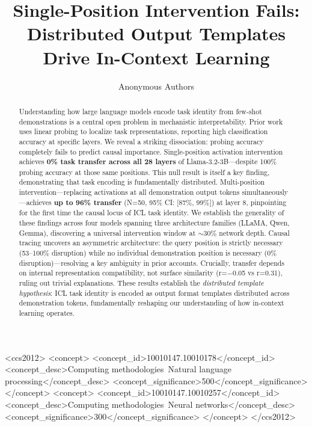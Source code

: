 \documentclass[sigconf,anonymous]{acmart}
\begin{document}
\title{Single-Position Intervention Fails: Distributed Output Templates Drive In-Context Learning}

\author{Anonymous Authors}

\begin{abstract}
Understanding how large language models encode task identity from few-shot demonstrations is a central open problem in mechanistic interpretability. Prior work uses linear probing to localize task representations, reporting high classification accuracy at specific layers. We reveal a striking dissociation: probing accuracy completely fails to predict causal importance. Single-position activation intervention achieves \textbf{0\% task transfer across all 28 layers} of Llama-3.2-3B---despite 100\% probing accuracy at those same positions. This null result is itself a key finding, demonstrating that task encoding is fundamentally distributed. Multi-position intervention---replacing activations at all demonstration output tokens simultaneously---achieves \textbf{up to 96\% transfer} (N=50, 95\% CI: [87\%, 99\%]) at layer 8, pinpointing for the first time the causal locus of ICL task identity. We establish the generality of these findings across four models spanning three architecture families (LLaMA, Qwen, Gemma), discovering a universal intervention window at $\sim$30\% network depth. Causal tracing uncovers an asymmetric architecture: the query position is strictly necessary (53--100\% disruption) while no individual demonstration position is necessary (0\% disruption)---resolving a key ambiguity in prior accounts. Crucially, transfer depends on internal representation compatibility, not surface similarity (r=$-$0.05 vs r=0.31), ruling out trivial explanations. These results establish the \emph{distributed template hypothesis}: ICL task identity is encoded as output format templates distributed across demonstration tokens, fundamentally reshaping our understanding of how in-context learning operates.
\end{abstract}

\begin{CCSXML}
<ccs2012>
<concept>
<concept_id>10010147.10010178</concept_id>
<concept_desc>Computing methodologies~Natural language processing</concept_desc>
<concept_significance>500</concept_significance>
</concept>
<concept>
<concept_id>10010147.10010257</concept_id>
<concept_desc>Computing methodologies~Neural networks</concept_desc>
<concept_significance>300</concept_significance>
</concept>
</ccs2012>
\end{CCSXML}
\end{document}
